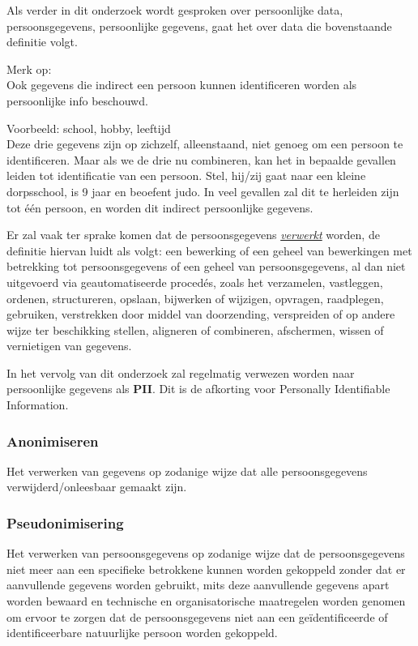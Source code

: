 Als verder in dit onderzoek wordt gesproken over persoonlijke data, persoonsgegevens, persoonlijke gegevens, gaat het over data die bovenstaande definitie volgt.
 
  Merk op:
  \\ Ook gegevens die indirect een persoon kunnen identificeren worden als persoonlijke info beschouwd. 
 
 Voorbeeld: school, hobby, leeftijd
 \\ Deze drie gegevens zijn op zichzelf, alleenstaand, niet genoeg om een persoon te identificeren.
 Maar als we de drie nu combineren, kan het in bepaalde gevallen leiden tot identificatie van een persoon. Stel, hij/zij gaat naar een kleine dorpsschool, is 9 jaar en beoefent judo. In veel gevallen zal dit te herleiden zijn tot één persoon, en worden dit indirect persoonlijke gegevens. 

Er zal vaak ter sprake komen dat de persoonsgegevens \underline{\textit{verwerkt}} worden, de definitie hiervan luidt als volgt: een bewerking of een geheel van bewerkingen met betrekking tot persoonsgegevens of een geheel van persoonsgegevens, al dan niet uitgevoerd via geautomatiseerde procedés, zoals het verzamelen, vastleggen, ordenen, structureren, opslaan, bijwerken of wijzigen, opvragen, raadplegen, gebruiken, verstrekken door middel van doorzending, verspreiden of op andere wijze ter beschikking stellen, aligneren of combineren, afschermen, wissen of vernietigen van gegevens.

In het vervolg van dit onderzoek zal regelmatig verwezen worden naar persoonlijke gegevens als \textbf{PII}. Dit is de afkorting voor Personally Identifiable Information.

\subsubsection{Anonimiseren}
Het verwerken van gegevens op zodanige wijze dat alle persoonsgegevens verwijderd/onleesbaar gemaakt zijn. 

\subsubsection{Pseudonimisering} 
Het verwerken van persoonsgegevens op zodanige wijze dat de persoonsgegevens niet meer aan een specifieke betrokkene kunnen worden gekoppeld zonder dat er aanvullende gegevens worden gebruikt, mits deze aanvullende gegevens apart worden bewaard en technische en organisatorische maatregelen worden genomen om ervoor te zorgen dat de persoonsgegevens niet aan een geïdentificeerde of identificeerbare natuurlijke persoon worden gekoppeld. 

